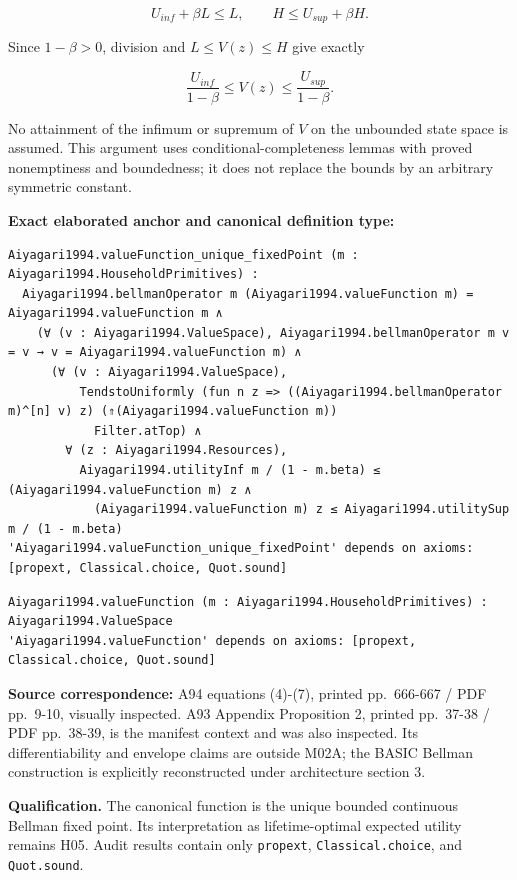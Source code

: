 \documentclass[
  11pt,
]{article}
\let\LedgerOriginalTexttt\texttt
\renewcommand{\texttt}[1]{{\small\LedgerOriginalTexttt{#1}}}
\begin{document}
\[U_{inf}+\beta L\leq L,\qquad H\leq U_{sup}+\beta H.\]

Since \(1-\beta>0\), division and \(L\leq V(z)\leq H\) give exactly

\[\frac{U_{inf}}{1-\beta}\leq V(z)\leq\frac{U_{sup}}{1-\beta}.\]

No attainment of the infimum or supremum of \(V\) on the unbounded state
space is assumed. This argument uses conditional-completeness lemmas
with proved nonemptiness and boundedness; it does not replace the bounds
by an arbitrary symmetric constant.

\textbf{Exact elaborated anchor and canonical definition type:}

\begin{verbatim}
Aiyagari1994.valueFunction_unique_fixedPoint (m : Aiyagari1994.HouseholdPrimitives) :
  Aiyagari1994.bellmanOperator m (Aiyagari1994.valueFunction m) = Aiyagari1994.valueFunction m ∧
    (∀ (v : Aiyagari1994.ValueSpace), Aiyagari1994.bellmanOperator m v = v → v = Aiyagari1994.valueFunction m) ∧
      (∀ (v : Aiyagari1994.ValueSpace),
          TendstoUniformly (fun n z => ((Aiyagari1994.bellmanOperator m)^[n] v) z) (⇑(Aiyagari1994.valueFunction m))
            Filter.atTop) ∧
        ∀ (z : Aiyagari1994.Resources),
          Aiyagari1994.utilityInf m / (1 - m.beta) ≤ (Aiyagari1994.valueFunction m) z ∧
            (Aiyagari1994.valueFunction m) z ≤ Aiyagari1994.utilitySup m / (1 - m.beta)
'Aiyagari1994.valueFunction_unique_fixedPoint' depends on axioms: [propext, Classical.choice, Quot.sound]
\end{verbatim}

\begin{verbatim}
Aiyagari1994.valueFunction (m : Aiyagari1994.HouseholdPrimitives) : Aiyagari1994.ValueSpace
'Aiyagari1994.valueFunction' depends on axioms: [propext, Classical.choice, Quot.sound]
\end{verbatim}

\textbf{Source correspondence:} A94 equations (4)-(7), printed
pp.~666-667 / PDF pp.~9-10, visually inspected. A93 Appendix Proposition
2, printed pp.~37-38 / PDF pp.~38-39, is the manifest context and was
also inspected. Its differentiability and envelope claims are outside
M02A; the BASIC Bellman construction is explicitly reconstructed under
architecture section 3.

\textbf{Qualification.} The canonical function is the unique bounded
continuous Bellman fixed point. Its interpretation as lifetime-optimal
expected utility remains H05. Audit results contain only
\texttt{propext}, \texttt{Classical.choice}, and \texttt{Quot.sound}.
\end{document}

